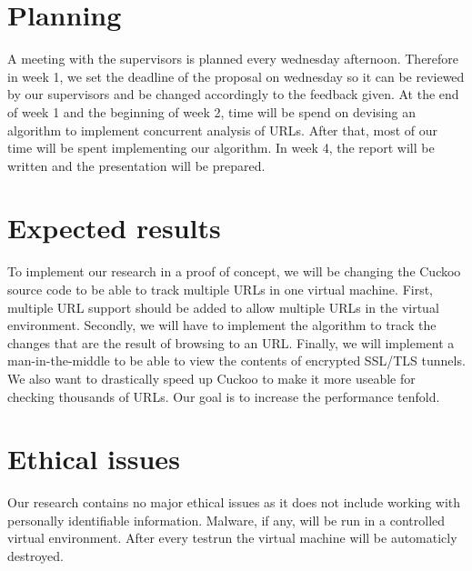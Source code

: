 \documentclass{scrartcl}
\begin{document}
\section{Planning}

A meeting with the supervisors is planned every wednesday afternoon. Therefore in week 1, we set the deadline of the proposal on wednesday so it can be reviewed by our supervisors and be changed accordingly to the feedback given. At the end of week 1 and the beginning of week 2, time will be spend on devising an algorithm to implement concurrent analysis of URLs. After that, most of our time will be spent implementing our algorithm. In week 4, the report will be written and the presentation will be prepared.

\section{Expected results}

To implement our research in a proof of concept, we will be changing the Cuckoo source code to be able to track multiple URLs in one virtual machine. First, multiple URL support should be added to allow multiple URLs in the virtual environment. Secondly, we will have to implement the algorithm to track the changes that are the result of browsing to an URL. Finally, we will implement a man-in-the-middle to be able to view the contents of encrypted SSL/TLS tunnels.\\

We also want to drastically speed up Cuckoo to make it more useable for checking thousands of URLs. Our goal is to increase the performance tenfold.

\section{Ethical issues}

Our research contains no major ethical issues as it does not include working with personally identifiable information. Malware, if any, will be run in a controlled virtual environment. After every testrun the virtual machine will be automaticly destroyed.



\end{document}
